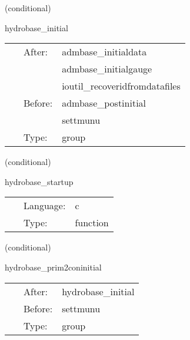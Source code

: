    (conditional) 

\hspace{5mm} hydrobase\_initial 

\hspace{5mm}{\it hydrobase initial data group } 


\hspace{5mm}

 \begin{tabular*}{160mm}{cll} 
~ & After:  & admbase\_initialdata \\ 
~& ~ &admbase\_initialgauge\\ 
~& ~ &ioutil\_recoveridfromdatafiles\\ 
~ & Before:  & admbase\_postinitial \\ 
~& ~ &settmunu\\ 
~ & Type:  & group \\ 
\end{tabular*} 


\vspace{5mm}

   (conditional) 

\hspace{5mm} hydrobase\_startup 

\hspace{5mm}{\it startup banner } 


\hspace{5mm}

 \begin{tabular*}{160mm}{cll} 
~ & Language:  & c \\ 
~ & Type:  & function \\ 
\end{tabular*} 


\vspace{5mm}

   (conditional) 

\hspace{5mm} hydrobase\_prim2coninitial 

\hspace{5mm}{\it recover the conservative variables from the primitive variables } 


\hspace{5mm}

 \begin{tabular*}{160mm}{cll} 
~ & After:  & hydrobase\_initial \\ 
~ & Before:  & settmunu \\ 
~ & Type:  & group \\ 
\end{tabular*} 


